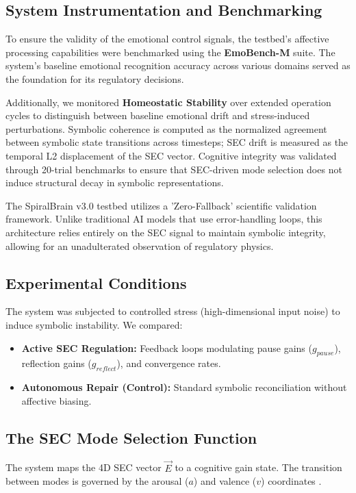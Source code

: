\documentclass[11pt]{article}
\begin{document}
\subsection{System Instrumentation and Benchmarking}
To ensure the validity of the emotional control signals, the testbed's affective processing capabilities were benchmarked using the \textbf{EmoBench-M} suite. The system's baseline emotional recognition accuracy across various domains served as the foundation for its regulatory decisions.

Additionally, we monitored \textbf{Homeostatic Stability} over extended operation cycles to distinguish between baseline emotional drift and stress-induced perturbations. Symbolic coherence is computed as the normalized agreement between symbolic state transitions across timesteps; SEC drift is measured as the temporal L2 displacement of the SEC vector. Cognitive integrity was validated through 20-trial benchmarks to ensure that SEC-driven mode selection does not induce structural decay in symbolic representations.

The SpiralBrain v3.0 testbed utilizes a 'Zero-Fallback' scientific validation framework. Unlike traditional AI models that use error-handling loops, this architecture relies entirely on the SEC signal to maintain symbolic integrity, allowing for an unadulterated observation of regulatory physics.

\subsection{Experimental Conditions}
The system was subjected to controlled stress (high-dimensional input noise) to induce symbolic instability. We compared:
\begin{itemize}
    \item \textbf{Active SEC Regulation:} Feedback loops modulating pause gains ($g_{pause}$), reflection gains ($g_{reflect}$), and convergence rates.
    \item \textbf{Autonomous Repair (Control):} Standard symbolic reconciliation without affective biasing.
\end{itemize}

\subsection{The SEC Mode Selection Function}

The system maps the 4D SEC vector $\vec{E}$ to a cognitive gain state. The transition between modes is governed by the arousal ($a$) and valence ($v$) coordinates \cite{friston2010free}.
\end{document}
